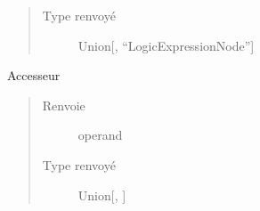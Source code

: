 \documentclass[letterpaper,10pt,french]{sphinxmanual}
\begin{document}
\begin{fulllineitems}
\begin{fulllineitems}
\begin{quote}
\begin{description}
\item[{Type renvoyé}] \leavevmode
Union{[}{\hyperref[\detokenize{comparaisonexpressionnodes:comparaisonexpressionnodes.ComparaisonExpressionNode}]{}}, “LogicExpressionNode”{]}

\end{description}\end{quote}

\end{fulllineitems}


\begin{fulllineitems}
\label{\detokenize{logicexpressionnodes:logicexpressionnodes.AndNode.operands}}
Accesseur
\begin{quote}\begin{description}
\item[{Renvoie}] \leavevmode
operand

\item[{Type renvoyé}] \leavevmode
Union{[}{\hyperref[\detokenize{logicexpressionnodes:logicexpressionnodes.LogicExpressionNode}]{}}, {\hyperref[\detokenize{comparaisonexpressionnodes:comparaisonexpressionnodes.ComparaisonExpressionNode}]{}}{]}

\end{description}\end{quote}

\end{fulllineitems}


\end{fulllineitems}

\end{document}
